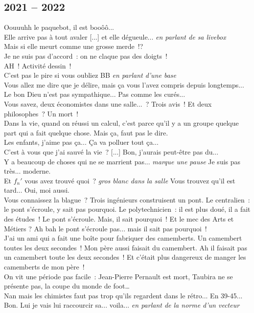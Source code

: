 \documentclass[french, a4paper, openany]{book}
\begin{document}
	\subsection*{2021 -- 2022}
		\noindent \og Oouuuhh le paquebot, il est booôô... \fg \\
		\og Elle arrive pas à tout avaler [...] et elle dégueule... \fg \emph{en parlant de sa livebox} \\
		\og Mais si elle meurt comme une grosse merde~!? \fg \\
		\og Je ne suis pas d'accord~: on ne claque pas des doigts~! \fg \\
		\og AH~! Activité dessin~! \fg \\
		\og C'est pas le pire si vous oubliez BB \fg \emph{en parlant d'une base} \\
		\og Vous allez me dire que je délire, mais ça vous l'avez compris depuis longtemps... \fg \\
		\og Le bon Dieu n'est pas sympathique... Pas comme les curés... \fg \\
		\og Vous savez, deux économistes dans une salle...~? Trois avis~! Et deux philosophes~? Un mort~! \fg \\
		\og Dans la vie, quand on réussi un calcul, c'est parce qu'il y a un groupe quelque part qui a fait quelque chose. Mais ça, faut pas le dire. \fg \\
		\og Les enfants, j'aime pas ça... Ça va polluer tout ça... \fg \\
		\og C'est à vous que j'ai sauvé la vie~? [...] Bon, j'aurais peut-être pas du... \fg \\
		\og Y a beaucoup de choses qui ne se marrient pas... \emph{marque une pause} Je suis pas très... moderne. \fg \\
		\og Et $f_n'$ vous avez trouvé quoi~? \emph{gros blanc dans la salle} Vous trouvez qu'il est tard... Oui, moi aussi. \fg \\
		\og Vous connaissez la blague~? Trois ingénieurs construisent un pont. Le centralien~: le pont s'écroule, y sait pas pourquoi. Le polytechnicien~: il est plus doué, il a fait des études~! Le pont s'écroule. Mais, il sait pourquoi~! Et le mec des Arts et Métiers ? Ah bah le pont s'écroule pas... mais il sait pas pourquoi~! \fg \\
		\og J'ai un ami qui a fait une boîte pour fabriquer des camemberts. Un camembert toutes les deux secondes~! Mon père aussi faisait du camembert. Ah il faisait pas un camembert toute les deux secondes~! Et c'était plus dangereux de manger les camemberts de mon père~! \fg \\
		\og On vit une période pas facile~: Jean-Pierre Pernault est mort, Taubira ne se présente pas, la coupe du monde de foot… \fg \\
		\og Nan mais les chimistes faut pas trop qu'ils regardent dans le rétro... En 39-45... \fg \\
		\og Bon. Lui je vais lui raccourcir sa... voila... \emph{en parlant de la norme d'un vecteur}\fg \\
		
\end{document}
